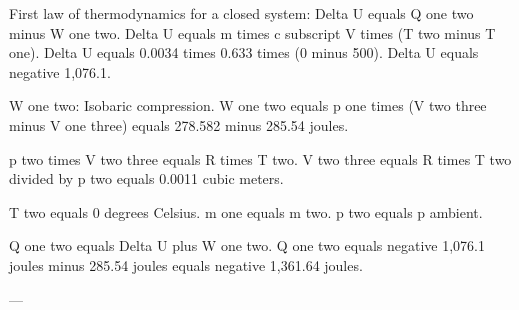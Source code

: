 First law of thermodynamics for a closed system:  
Delta U equals Q one two minus W one two.  
Delta U equals m times c subscript V times (T two minus T one).  
Delta U equals 0.0034 times 0.633 times (0 minus 500).  
Delta U equals negative 1,076.1.  

W one two: Isobaric compression.  
W one two equals p one times (V two three minus V one three) equals 278.582 minus 285.54 joules.  

p two times V two three equals R times T two.  
V two three equals R times T two divided by p two equals 0.0011 cubic meters.  

T two equals 0 degrees Celsius.  
m one equals m two.  
p two equals p ambient.  

Q one two equals Delta U plus W one two.  
Q one two equals negative 1,076.1 joules minus 285.54 joules equals negative 1,361.64 joules.  

---